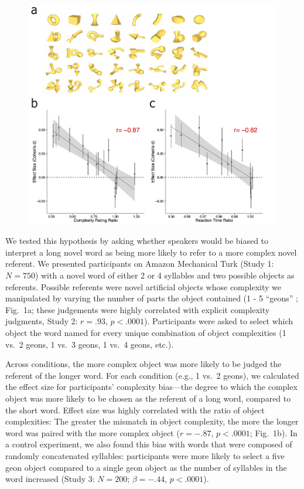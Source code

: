 \documentclass[12pt]{article}
\begin{document}
\begin{figure}[t]
\begin{center}
\includegraphics[scale = .5]{figs/geons.pdf}
\caption{}
\end{center}
\label{fig:geons}
\end{figure}

We tested this hypothesis by asking whether speakers would be biased to interpret a long novel word as being more likely to refer to a more complex novel referent. We presented participants on Amazon Mechanical Turk (Study 1: $N=750$) with a novel word of either 2 or 4 syllables and two possible objects as referents. Possible referents were novel artificial objects whose complexity we manipulated by varying the number of parts the object contained (1 - 5 ``geons'' \cite{biederman1987}; Fig.\ 1a; these judgements were highly correlated with explicit complexity judgments, Study 2: $r = .93$, $p < .0001$). Participants were asked to select which object the word named for every unique combination of object complexities (1 vs.\ 2 geons, 1 vs.\ 3 geons, 1 vs.\ 4 geons, etc.).

Across conditions, the more complex object was more likely to be judged the referent of the longer word. For each condition (e.g., 1 vs.\ 2 geons), we calculated the effect size for participants' complexity bias---the degree to which the complex object was more likely to be chosen as the referent of a long word, compared to the short word.  Effect size was highly correlated with the ratio of object complexities: The greater the mismatch in object complexity, the more the longer word was paired with the more complex object ($r = -.87$, $p < .0001$; Fig.\ 1b). In a control experiment, we also found this bias with words that were composed of randomly concatenated syllables: participants were more likely to select a five geon object compared to a single geon object as the number of syllables in the word increased (Study 3: $N=200$; $\beta=-.44$, $p <.0001$).
					
\end{document}
